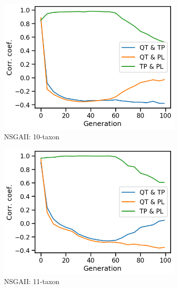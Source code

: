 \begin{figure}[!htbp]
\centering
\begin{subfigure}[b]{0.33\textwidth}
			\includegraphics[width=\textwidth]{Figure/10-taxon_NSGAII_corr_plot}
			\caption{NSGAII: 10-taxon}
\end{subfigure}\begin{subfigure}[b]{0.33\textwidth}
			\includegraphics[width=\textwidth]{Figure/11-taxon_NSGAII_corr_plot}
			\caption{NSGAII: 11-taxon}
\end{subfigure}\begin{subfigure}[b]{0.33\textwidth}

\end{subfigure}
\end{figure}
